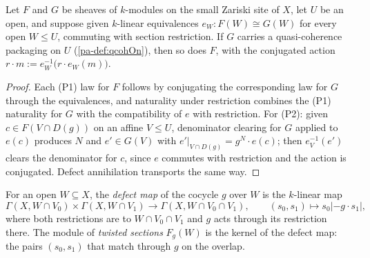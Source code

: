\begin{definition}
  \label{pa-def:qcohOn_transport}
  \leanok

  Let \(F\) and \(G\) be sheaves of \(k\)-modules on the small Zariski site of \(X\), let
  \(U\) be an open, and suppose given \(k\)-linear equivalences
  \(e_W : F(W) \cong G(W)\) for every open \(W \le U\), commuting with section
  restriction. If \(G\) carries a quasi-coherence packaging on \(U\)
  (\ref{pa-def:qcohOn}), then so does \(F\), with the conjugated action
  \(r \cdot m := e_W^{-1}\bigl(r \cdot e_W(m)\bigr)\).
\end{definition}
\begin{proof}
  \leanok
  Each (P1) law for \(F\) follows by conjugating the corresponding law for \(G\) through
  the equivalences, and naturality under restriction combines the (P1) naturality for
  \(G\) with the compatibility of \(e\) with restriction. For (P2): given
  \(c \in F(V \cap D(g))\) on an affine \(V \le U\), denominator clearing for \(G\)
  applied to \(e(c)\) produces \(N\) and \(e' \in G(V)\) with
  \(e'|_{V \cap D(g)} = g^N \cdot e(c)\); then \(e_V^{-1}(e')\) clears the denominator
  for \(c\), since \(e\) commutes with restriction and the action is conjugated. Defect
  annihilation transports the same way.
\end{proof}

\begin{definition}
  \label{pa-def:twistSections}
  \leanok

  For an open \(W \subseteq X\), the \emph{defect map} of the cocycle \(g\) over \(W\) is
  the \(k\)-linear map
  \[
    \Gamma(X, W \cap V_0) \times \Gamma(X, W \cap V_1) \longrightarrow
      \Gamma(X, W \cap V_0 \cap V_1), \qquad
    (s_0, s_1) \longmapsto s_0| - g \cdot s_1|,
  \]
  where both restrictions are to \(W \cap V_0 \cap V_1\) and \(g\) acts through its
  restriction there. The module of \emph{twisted sections} \(F_g(W)\) is the kernel of
  the defect map: the pairs \((s_0, s_1)\) that match through \(g\) on the overlap.
\end{definition}

